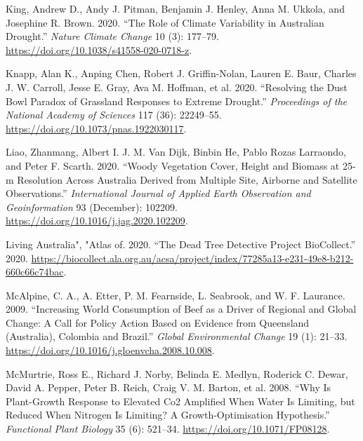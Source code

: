 \documentclass[
]{article}
\newlength{\cslhangindent}
\newlength{\cslentryspacingunit} %
\newenvironment{CSLReferences}[2] %
 {%
  \setlength{\parindent}{0pt}
  \ifodd #1
  \let\oldpar\par
  \def\par{\hangindent=\cslhangindent\oldpar}
  \fi
  \setlength{\parskip}{#2\cslentryspacingunit}
 }%
 {}
\begin{document}
\begin{CSLReferences}{1}{0}
\leavevmode{}%
King, Andrew D., Andy J. Pitman, Benjamin J. Henley, Anna M. Ukkola, and
Josephine R. Brown. 2020. {``The Role of Climate Variability in
{Australian} Drought.''} \emph{Nature Climate Change} 10 (3): 177--79.
\url{https://doi.org/10.1038/s41558-020-0718-z}.

\leavevmode{}%
Knapp, Alan K., Anping Chen, Robert J. Griffin-Nolan, Lauren E. Baur,
Charles J. W. Carroll, Jesse E. Gray, Ava M. Hoffman, et al. 2020.
{``Resolving the {Dust Bowl} Paradox of Grassland Responses to Extreme
Drought.''} \emph{Proceedings of the National Academy of Sciences} 117
(36): 22249--55. \url{https://doi.org/10.1073/pnas.1922030117}.

\leavevmode{}%
Liao, Zhanmang, Albert I. J. M. Van Dijk, Binbin He, Pablo Rozas
Larraondo, and Peter F. Scarth. 2020. {``Woody Vegetation Cover, Height
and Biomass at 25-m Resolution Across {Australia} Derived from Multiple
Site, Airborne and Satellite Observations.''} \emph{International
Journal of Applied Earth Observation and Geoinformation} 93 (December):
102209. \url{https://doi.org/10.1016/j.jag.2020.102209}.

\leavevmode{}%
Living Australia", "Atlas of. 2020. {``The {Dead Tree Detective}
\textbar{} {Project} \textbar{} {BioCollect}.''} 2020.
\url{https://biocollect.ala.org.au/acsa/project/index/77285a13-e231-49e8-b212-660c66c74bac}.

\leavevmode{}%
McAlpine, C. A., A. Etter, P. M. Fearnside, L. Seabrook, and W. F.
Laurance. 2009. {``Increasing World Consumption of Beef as a Driver of
Regional and Global Change: {A} Call for Policy Action Based on Evidence
from {Queensland} ({Australia}), {Colombia} and {Brazil}.''}
\emph{Global Environmental Change} 19 (1): 21--33.
\url{https://doi.org/10.1016/j.gloenvcha.2008.10.008}.

\leavevmode{}%
McMurtrie, Ross E., Richard J. Norby, Belinda E. Medlyn, Roderick C.
Dewar, David A. Pepper, Peter B. Reich, Craig V. M. Barton, et al. 2008.
{``Why Is Plant-Growth Response to Elevated {Co2} Amplified When Water
Is Limiting, but Reduced When Nitrogen Is Limiting? {A}
Growth-Optimisation Hypothesis.''} \emph{Functional Plant Biology} 35
(6): 521--34. \url{https://doi.org/10.1071/FP08128}.


\end{CSLReferences}
\end{document}
